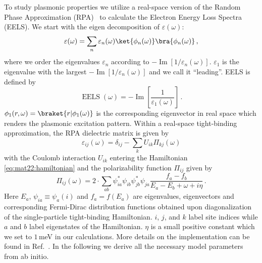 To study plasmonic properties we utilize a real-space version of the Random Phase Approximation (RPA)~\cite{Vonsov2012QuantumSolidS,giuliani_quantum_2005,wang_plasmonic_2015,westerhout_plasmon_2018,jiang_plasmonic_2021} to calculate the Electron Energy Loss Spectra (EELS). We start with the eigen decomposition of $\varepsilon(\omega)$:
\begin{equation*}
    \varepsilon(\omega) = \sum_n \varepsilon_n(\omega) \ket{\phi_n(\omega)} \bra{\phi_n(\omega)} \,,
\end{equation*}
where we order the eigenvalues $\varepsilon_n$ according to $-\operatorname{Im}[1 / \varepsilon_n(\omega)]$. $\varepsilon_1$ is the eigenvalue with the largest $-\operatorname{Im}[1 / \varepsilon_n(\omega)]$ and we call it ``leading''. EELS is defined by
\begin{equation*}
    \operatorname{EELS}(\omega) = 
    -\operatorname{Im}\left[ \frac{1}{\varepsilon_1(\omega)} \right] \,.
\end{equation*}
$\phi_1(r, \omega) = \braket{r | \phi_1(\omega)}$ is the corresponding eigenvector in real space which renders the plasmonic excitation pattern. Within a real-space tight-binding approximation, the RPA dielectric matrix is given by
\begin{equation}\label{eq:mat22:Eps_pz}
    \varepsilon_{ij}(\omega) =
        \delta_{ij} -
        \sum_{k} U_{ik} \Pi_{kj}(\omega)
\end{equation}
with the Coulomb interaction $U_{ik}$ entering the Hamiltonian \eqref{eq:mat22:hamiltonian} and the polarizability function $\Pi_{ij}$ given by
\begin{equation}\label{eqn-Pi_pz}
    \Pi_{ij}(\omega) = 
        2 \cdot \sum_{ab} \psi_{ia}^* \psi_{ib} \psi_{jb}^* \psi_{ja}
        \frac{f_a - f_b}{E_a - E_b + \omega + i\eta} \,.
\end{equation}
Here $E_a$, $\psi_{ia} \equiv \psi_{a}(i)$ and $f_a = f(E_a)$ are eigenvalues, eigenvectors and corresponding Fermi-Dirac distribution functions obtained upon diagonalization of the single-particle tight-binding Hamiltonian. $i$, $j$, and $k$ label site indices while $a$ and $b$ label eigenstates of the Hamiltonian. $\eta$ is a small positive constant which we set to $1\,$meV in our calculations. More details on the implementation can be found in Ref.~\cite{westerhout_plasmon_2018}.
In the following we derive all the necessary model parameters from ab initio.
    
